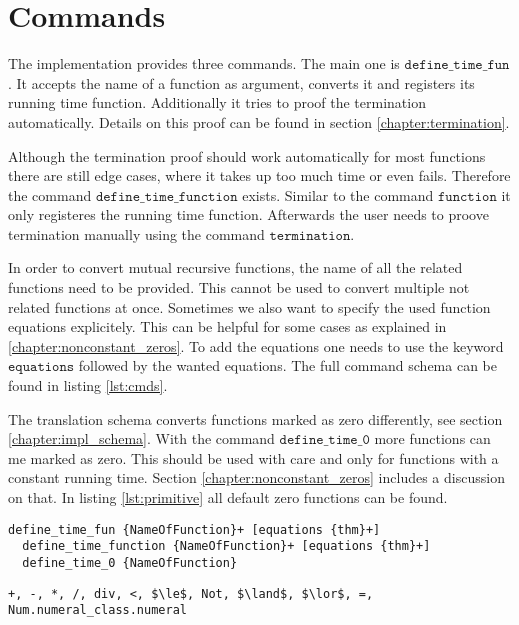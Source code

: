 

\section{Commands}\label{chapter:commands}

The implementation provides three commands.
The main one is $\texttt{define\_time\_fun}$.
It accepts the name of a function as argument, converts it and registers its running time function.
Additionally it tries to proof the termination automatically.
Details on this proof can be found in section \ref{chapter:termination}.

Although the termination proof should work automatically for most functions there are still edge cases, where it takes up too much time or even fails.
Therefore the command $\texttt{define\_time\_function}$ exists.
Similar to the command $\texttt{function}$ it only registeres the running time function.
Afterwards the user needs to proove termination manually using the command $\texttt{termination}$.

In order to convert mutual recursive functions, the name of all the related functions need to be provided.
This cannot be used to convert multiple not related functions at once.
Sometimes we also want to specify the used function equations explicitely.
This can be helpful for some cases as explained in \ref{chapter:nonconstant_zeros}.
To add the equations one needs to use the keyword $\texttt{equations}$ followed by the wanted equations.
The full command schema can be found in listing \ref{lst:cmds}.

The translation schema converts functions marked as zero differently, see section \ref{chapter:impl_schema}.
With the command $\texttt{define\_time\_0}$ more functions can me marked as zero.
This should be used with care and only for functions with a constant running time.
Section \ref{chapter:nonconstant_zeros} includes a discussion on that.
In listing \ref{lst:primitive} all default zero functions can be found.

\begin{lstlisting}[float,label=lst:cmds,caption=Schema of implemented command]
  define_time_fun {NameOfFunction}+ [equations {thm}+]
  define_time_function {NameOfFunction}+ [equations {thm}+]
  define_time_0 {NameOfFunction}
\end{lstlisting}

\begin{lstlisting}[float,label=lst:primitive,caption=Zero functions by default,mathescape=true]
  +, -, *, /, div, <, $\le$, Not, $\land$, $\lor$, =, Num.numeral_class.numeral
\end{lstlisting}

